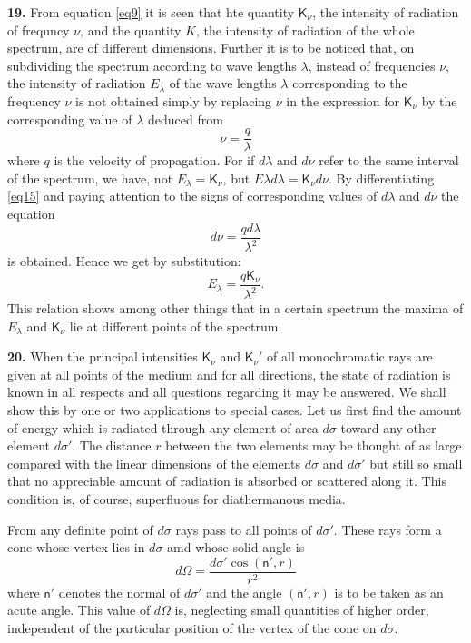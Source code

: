 \documentclass[12pt,oneside]{book}
\begin{document}
\textbf{19.} From equation \eqref{eq9} it is seen that hte quantity $\mathsf{K}_\nu$, the intensity of radiation of frequncy $\nu$, and the quantity $K$, the intensity of radiation of the whole spectrum, are of different dimensions. Further it is to be noticed that, on subdividing the spectrum according to wave lengths $\lambda$, instead of frequencies $\nu$, the intensity of radiation $E_\lambda$ of the wave lengths $\lambda$ corresponding to the frequency $\nu$ is not obtained simply by replacing $\nu$ in the expression for $\mathsf{K}_\nu$ by the corresponding value of $\lambda$ deduced from
\begin{equation}
    \nu=\frac{q}{\lambda}
    \label{eq15}
\end{equation}
where $q$ is the velocity of propagation. For if $d\lambda$ and $d\nu$ refer to the same interval of the spectrum, we have, not $E_\lambda=\mathsf{K}_\nu$, but $E\lambda d\lambda=\mathsf{K}_\nu d\nu$. By differentiating \eqref{eq15} and paying attention to the signs of corresponding values of $d\lambda$ and $d\nu$ the equation
\begin{equation*}
    d\nu=\frac{qd\lambda}{\lambda^2}
\end{equation*}
is obtained. Hence we get by substitution:
\begin{equation}
    \label{eq16}
    E_\lambda=\frac{q\mathsf{K}_\nu}{\lambda^2}.
\end{equation}
This relation shows among other things that in a certain spectrum the maxima of $E_\lambda$ and $\mathsf{K}_\nu$ lie at different points of the spectrum. \par

\textbf{20.} When the principal intensities $\mathsf{K}_\nu$ and $\mathsf{K}_\nu'$ of all monochromatic rays are given at all points of the medium and for all directions, the state of radiation is known in all respects and all questions regarding it may be answered. We shall show this by one or two applications to special cases. Let us first find the amount of energy which is radiated through any element of area $d\sigma$ toward any other element $d\sigma'$. The distance $r$ between the two elements may be thought of as large compared with the linear dimensions of the elements $d\sigma$ and $d\sigma'$ but still so small that no appreciable amount of radiation is absorbed or scattered along it. This condition is, of course, superfluous for diathermanous media. \par

From any definite point of $d\sigma$ rays pass to all points of $d\sigma'$. These rays form a cone whose vertex lies in $d\sigma$ amd whose solid angle is
\begin{equation*}
    d\Omega=\frac{d\sigma'\cos(\mathsf{n}',r)}{r^2}
\end{equation*}
where $\mathsf{n}'$ denotes the normal of $d\sigma'$ and the angle $(\mathsf{n}',r)$ is to be taken as an acute angle. This value of $d\Omega$ is, neglecting small quantities of higher order, independent of the particular position of the vertex of the cone on $d\sigma$. \par
\end{document}
